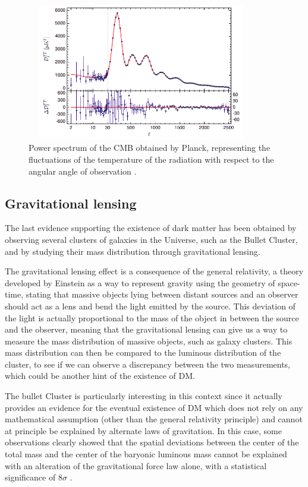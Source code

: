 \documentclass[a4paper, 10pt, openright]{report}
\begin{document}
\begin{figure}[htbp]
\begin{center}
\includegraphics[width=10cm, height=6cm]{figs/PlanckSpectrum.png}
\caption{Power spectrum of the \ac{CMB} obtained by Planck, representing the fluctuations of the temperature of the radiation with respect to the angular angle of observation \cite{Planck}.}
\label{figure:CMBSpectrum}
\end{center}
\end{figure}

\subsection{Gravitational lensing}

The last evidence supporting the existence of dark matter has been obtained by observing several clusters of galaxies in the Universe, such as the Bullet Cluster, and by studying their mass distribution through gravitational lensing.

The gravitational lensing effect is a consequence of the general relativity, a theory developed by Einstein as a way to represent gravity using the geometry of space-time, stating that massive objects lying between distant sources and an observer should act as a lens and bend the light emitted by the source. This deviation of the light is actually proportional to the mass of the object in between the source and the observer, meaning that the gravitational lensing can give us a way to measure the mass distribution of massive objects, such as galaxy clusters. This mass distribution can then be compared to the luminous distribution of the cluster, to see if we can observe a discrepancy between the two measurements, which could be another hint of the existence of \ac{DM}.

The bullet Cluster is particularly interesting in this context since it actually provides an evidence for the eventual existence of \ac{DM} which does not rely on any mathematical assumption (other than the general relativity principle) and cannot at principle be explained by alternate laws of gravitation. In this case, some observations clearly showed that the spatial deviations between the center of the total mass and the center of the baryonic luminous mass cannot be explained with an alteration of the gravitational force law alone, with a statistical significance of $8 \sigma$ \cite{BulletClusterSigma}.
\end{document}
